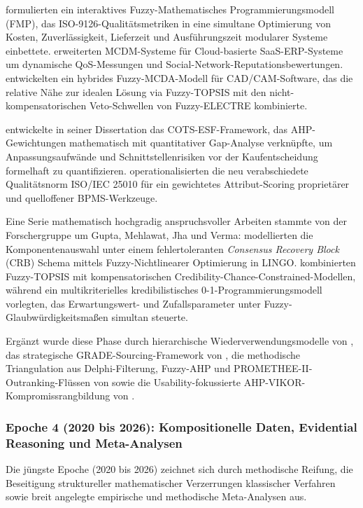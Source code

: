 \textcite{6YJHIVHG} formulierten ein interaktives Fuzzy-Mathematisches Programmierungsmodell (FMP), das ISO-9126-Qualitätsmetriken in eine simultane Optimierung von Kosten, Zuverlässigkeit, Lieferzeit und Ausführungszeit modularer Systeme einbettete. \textcite{W8P543Y2} erweiterten MCDM-Systeme für Cloud-basierte SaaS-ERP-Systeme um dynamische QoS-Messungen und Social-Network-Reputationsbewertungen. \textcite{VRTXHQI7} entwickelten ein hybrides Fuzzy-MCDA-Modell für CAD/CAM-Software, das die relative Nähe zur idealen Lösung via Fuzzy-TOPSIS mit den nicht-kompensatorischen Veto-Schwellen von Fuzzy-ELECTRE kombinierte.

\textcite{WZM7DUBY} entwickelte in seiner Dissertation das COTS-ESF-Framework, das AHP-Gewichtungen mathematisch mit quantitativer Gap-Analyse verknüpfte, um Anpassungsaufwände und Schnittstellenrisiken vor der Kaufentscheidung formelhaft zu quantifizieren. \textcite{LYMHTPXS} operationalisierten die neu verabschiedete Qualitätsnorm ISO/IEC 25010 für ein gewichtetes Attribut-Scoring proprietärer und quelloffener BPMS-Werkzeuge.

Eine Serie mathematisch hochgradig anspruchsvoller Arbeiten stammte von der Forschergruppe um Gupta, Mehlawat, Jha und Verma: \textcite{P9SATBH5} modellierten die Komponentenauswahl unter einem fehlertoleranten \textit{Consensus Recovery Block} (CRB) Schema mittels Fuzzy-Nichtlinearer Optimierung in LINGO. \textcite{B7ZTQCZZ} kombinierten Fuzzy-TOPSIS mit kompensatorischen Credibility-Chance-Constrained-Modellen, während \textcite{JX4RDRDU} ein multikriterielles kredibilistisches 0-1-Programmierungsmodell vorlegten, das Erwartungswert- und Zufallsparameter unter Fuzzy-Glaubwürdigkeitsmaßen simultan steuerte.

Ergänzt wurde diese Phase durch hierarchische Wiederverwendungsmodelle von \textcite{DFASRUVC}, das strategische GRADE-Sourcing-Framework von \textcite{JT5X3FIG}, die methodische Triangulation aus Delphi-Filterung, Fuzzy-AHP und PROMETHEE-II-Outranking-Flüssen von \textcite{NZJEEPAC} sowie die Usability-fokussierte AHP-VIKOR-Kompromissrangbildung von \textcite{QNWK8SAP}.

\subsubsection{Epoche 4 (2020 bis 2026): Kompositionelle Daten, Evidential Reasoning und Meta-Analysen}
\label{subsubsec:epoche4}

Die jüngste Epoche (2020 bis 2026) zeichnet sich durch methodische Reifung, die Beseitigung struktureller mathematischer Verzerrungen klassischer Verfahren sowie breit angelegte empirische und methodische Meta-Analysen aus.

